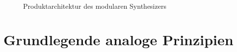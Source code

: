 \begin{figure}[h]
	\centering
	\setlength{\fboxsep}{1pt} %
	\setlength{\fboxrule}{1pt} %
	\caption{Produktarchitektur des modularen Synthesizers}
	\label{fig:fig:Produktarchitektur}
\end{figure}


\newpage
\section{Grundlegende analoge Prinzipien}
\label{sec:AnalogePrinzipien}





